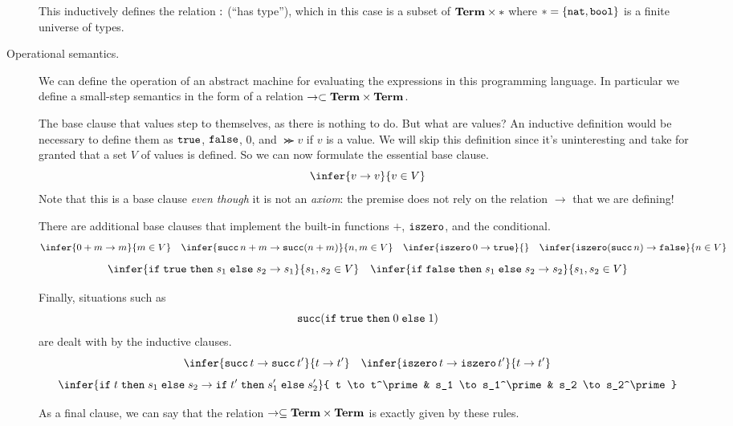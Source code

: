 \documentclass[11pt,letterpaper]{article}
\begin{document}
\begin{description}
        This inductively defines the relation $\operatorname{:}$ (``has type''), which
        in this case is a subset of $\mathbf{Term} \times *$ where
        $* = \{\mathtt{nat}, \mathtt{bool}\}$ is a finite universe of types.

    \item[Operational semantics.]
        We can define the operation of an abstract machine for evaluating the
        expressions in this programming language. In particular we define a
        small-step semantics in the form of a relation
        $\to \subset \mathbf{Term} \times \mathbf{Term}$.

        The base clause that values step to themselves, as there is nothing to
        do. But what are values? An inductive definition would be necessary to
        define them as $\mathtt{true}$, $\mathtt{false}$, $0$, and $\Succ v$ if $v$ is a value.
        We will skip this definition since it's uninteresting and take for
        granted that a set $V$ of values is defined. So we can now formulate
        the essential base clause.
        $$
        \infer{v \to v}{v \in V}
        $$
        Note that this is a base clause \emph{even though} it is not an
        \emph{axiom}: the premise does not rely on the relation $\to$ that we
        are defining!

        There are additional base clauses that implement the built-in functions
        $+$, $\operatorname{\mathtt{iszero}}$, and the conditional.
        $$
        \infer{0 + m \to m}{m \in V}
        \quad
        \infer{\Succ n + m \to \Succ (n + m)}{n, m \in V}
        \quad
        \infer{\iszero 0 \to \true}{}
        \quad
        \infer{\iszero (\Succ n) \to \false}{n \in V}
        $$
        $$
        \infer{\ifthenelse{\true}{s_1}{s_2} \to s_1}{s_1, s_2 \in V}
        \quad
        \infer{\ifthenelse{\false}{s_1}{s_2} \to s_2}{s_1, s_2 \in V}
        $$

        Finally, situations such as
        $$
        \operatorname{\mathtt{succ}} (\mathtt{if}\; \mathtt{true} \;\mathtt{then}\; 0 \;\mathtt{else}\; 1)
        $$
        are dealt with by the inductive clauses.
        $$
        \infer{\Succ t \to \Succ t^\prime}{t \to t^\prime}
        \quad
        \infer{\iszero t \to \iszero t^\prime}{t \to t^\prime}
        $$
        $$
        \infer{
            \ifthenelse{t}{s_1}{s_2}
            \to
            \ifthenelse{t^\prime}{s_1^\prime}{s_2^\prime}
        }{
            t \to t^\prime
            &
            s_1 \to s_1^\prime
            &
            s_2 \to s_2^\prime
        }
        $$

        As a final clause, we can say that the relation
        $\to \subseteq \mathbf{Term} \times \mathbf{Term}$ is exactly given by these rules.
\end{description}
\end{document}
